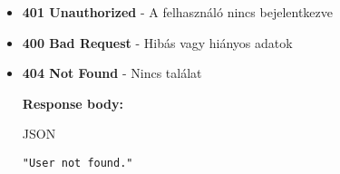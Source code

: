 \documentclass[12pt]{report}
\begin{document}
\begin{description}
\begin{itemize}
        \textbf{Response body:}
        \begin{codeblock}{JSON}
          \begin{verbatim}
{
  "id": "string($uuid)",
  "createdAt": "string($date-time)",
  "email": "string($email)",
  "firstName": "string",
  "lastName": "string",
  "profilePictureBase64": "string",
  "longestStreak": Number
}
          \end{verbatim}
        \end{codeblock}

      \item \textbf{401 Unauthorized} - A felhasználó nincs bejelentkezve

      \item \textbf{400 Bad Request} - Hibás vagy hiányos adatok
      
      \item \textbf{404 Not Found} - Nincs találat

        \textbf{Response body:}
        \begin{codeblock}{JSON}
          \begin{verbatim}
"User not found."
          \end{verbatim}
        \end{codeblock}
    \end{itemize}
\end{description}
\end{document}
